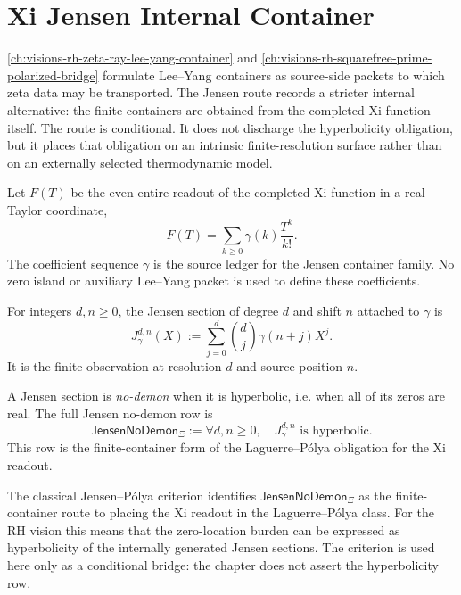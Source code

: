\chapter{Xi Jensen Internal Container}
\label{ch:visions-rh-xi-jensen-internal-container}

\autoref{ch:visions-rh-zeta-ray-lee-yang-container} and
\autoref{ch:visions-rh-squarefree-prime-polarized-bridge} formulate
Lee--Yang containers as source-side packets to which zeta data may be
transported.  The Jensen route records a stricter internal alternative:
the finite containers are obtained from the completed Xi function
itself.  The route is conditional.  It does not discharge the
hyperbolicity obligation, but it places that obligation on an intrinsic
finite-resolution surface rather than on an externally selected
thermodynamic model.

\begin{definition}
\label{def:rh-xi-jensen-coefficient-row}
Let $F(T)$ be the even entire readout of the completed Xi function in a
real Taylor coordinate,
$$
F(T)=\sum_{k\ge0}\gamma(k)\frac{T^k}{k!}.
$$
The coefficient sequence $\gamma$ is the source ledger for the Jensen
container family.  No zero island or auxiliary Lee--Yang packet is used
to define these coefficients.
\end{definition}

\begin{definition}
\label{def:rh-jensen-section}
For integers $d,n\ge0$, the Jensen section of degree $d$ and shift $n$
attached to $\gamma$ is
$$
J_{\gamma}^{d,n}(X)
:=
\sum_{j=0}^{d}
\binom{d}{j}\gamma(n+j)X^j.
$$
It is the finite observation at resolution $d$ and source position
$n$.
\end{definition}

\begin{definition}
\label{def:rh-jensen-no-demon-row}
A Jensen section is \emph{no-demon} when it is hyperbolic, i.e. when all
of its zeros are real.  The full Jensen no-demon row is
$$
\mathsf{JensenNoDemon}_{\Xi}
:=
\forall d,n\ge0,\quad J_{\gamma}^{d,n}\text{ is hyperbolic}.
$$
This row is the finite-container form of the Laguerre--P\'olya
obligation for the Xi readout.
\end{definition}

\begin{principle}
\label{prin:rh-jensen-polya-finite-container-criterion}
The classical Jensen--P\'olya criterion identifies
$\mathsf{JensenNoDemon}_{\Xi}$ as the finite-container route to placing
the Xi readout in the Laguerre--P\'olya class.  For the RH vision this
means that the zero-location burden can be expressed as hyperbolicity of
the internally generated Jensen sections.  The criterion is used here
only as a conditional bridge: the chapter does not assert the
hyperbolicity row.
\end{principle}

